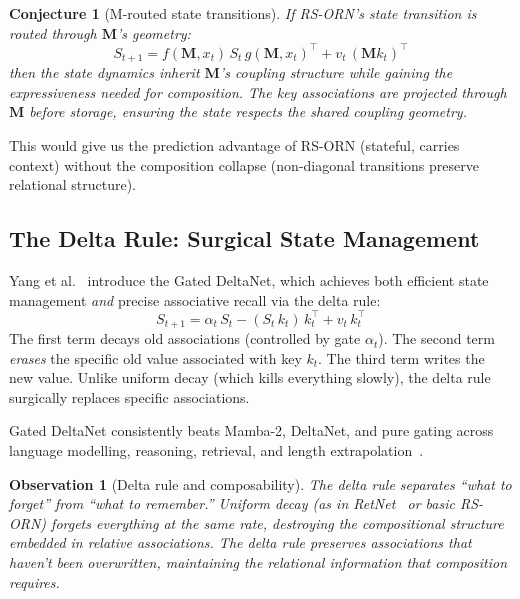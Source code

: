 \documentclass[11pt, a4paper]{article}
\newcommand{\M}{\mathbf{M}}
\theoremstyle{plain}
\newtheorem{observation}{Observation}
\newtheorem{conjecture}{Conjecture}
\theoremstyle{remark}
\begin{document}
\begin{conjecture}[M-routed state transitions]
If RS-ORN's state transition is routed through $\M$'s geometry:
\begin{equation}
    S_{t+1} = f(\M, x_t) \, S_t \, g(\M, x_t)^\top + v_t \, (\M k_t)^\top
\end{equation}
then the state dynamics inherit $\M$'s coupling structure while gaining the expressiveness needed for composition.
The key associations are projected through $\M$ before storage, ensuring the state respects the shared coupling geometry.
\end{conjecture}

This would give us the prediction advantage of RS-ORN (stateful, carries context) without the composition collapse (non-diagonal transitions preserve relational structure).

\subsection{The Delta Rule: Surgical State Management}

Yang et al.~\cite{yang2025gated} introduce the Gated DeltaNet, which achieves both efficient state management \emph{and} precise associative recall via the delta rule:
\begin{equation}
    S_{t+1} = \alpha_t \, S_t - (S_t \, k_t)\, k_t^\top + v_t \, k_t^\top
\end{equation}
The first term decays old associations (controlled by gate $\alpha_t$).
The second term \emph{erases} the specific old value associated with key $k_t$.
The third term writes the new value.
Unlike uniform decay (which kills everything slowly), the delta rule surgically replaces specific associations.

Gated DeltaNet consistently beats Mamba-2, DeltaNet, and pure gating across language modelling, reasoning, retrieval, and length extrapolation~\cite{yang2025gated}.

\begin{observation}[Delta rule and composability]
The delta rule separates ``what to forget'' from ``what to remember.''
Uniform decay (as in RetNet~\cite{sun2023retnet} or basic RS-ORN) forgets everything at the same rate, destroying the compositional structure embedded in relative associations.
The delta rule preserves associations that haven't been overwritten, maintaining the relational information that composition requires.
\end{observation}
\end{document}

